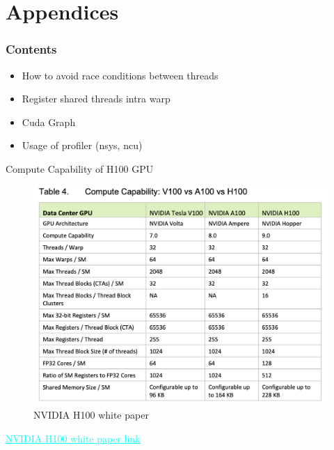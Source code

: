 \documentclass[dvipdfmx, 11pt, aspectratio=169]{beamer}   %
\newcommand{\ulhref}[2]{\href{#1}{\textcolor{cyan}{\uline{#2}}}}
\begin{document}
\section{Appendices}
\begin{frame}
    \frametitle{Contents}
    \linespread{0.6}\selectfont
\end{frame}
\begin{frame}
\begin{itemize}
  \item How to avoid race conditions between threads
  \item Register shared threads intra warp
  \item Cuda Graph
  \item Usage of profiler (nsys, ncu)
\end{itemize}
\end{frame}
\begin{frame}[fragile]{Compute Capability of H100 GPU}
  \begin{figure}
    \includegraphics[scale=0.25]{img/computeCapability.png}
    \caption{NVIDIA H100 white paper}
  \end{figure}
  \ulhref{https://www.advancedclustering.com/wp-content/uploads/2022/03/gtc22-whitepaper-hopper.pdf}{NVIDIA H100 white paper link}
\end{frame}
\end{document}
